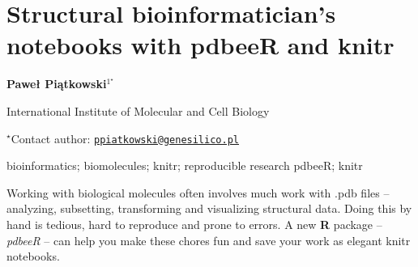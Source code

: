 \documentclass[\main/boa.tex]{subfiles}
\begin{document}
\section{Structural bioinformatician's notebooks with pdbeeR and knitr}

\begin{center}
  {\bf Paweł Piątkowski$^{1^\star}$}
\end{center}

\vskip 0.3cm

\begin{affiliations}
\begin{enumerate}
\begin{minipage}{0.915\textwidth}
\centering
\item International Institute of Molecular and Cell Biology \\[-2pt]
\end{minipage}
\end{enumerate}
$^\star$Contact author: \href{mailto:ppiatkowski@genesilico.pl}{\nolinkurl{ppiatkowski@genesilico.pl}}\\
\end{affiliations}

\vskip 0.5cm

\begin{minipage}{0.915\textwidth}
\keywords bioinformatics; biomolecules; knitr; reproducible research
\packages pdbeeR; knitr
\end{minipage}

\vskip 0.8cm

Working with biological molecules often involves much work with .pdb
files -- analyzing, subsetting, transforming and visualizing structural
data. Doing this by hand is tedious, hard to reproduce and prone to
errors. A new \textbf{R} package -- \emph{pdbeeR} -- can help you make
these chores fun and save your work as elegant knitr notebooks.
\end{document}
